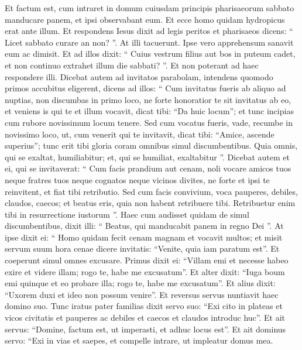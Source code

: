 \begin{biblechapter}
\begin{biblechapter}
\begin{biblechapter}
\begin{biblechapter}
\begin{biblechapter}
\begin{biblechapter}
\begin{biblechapter}
\begin{biblechapter}
\begin{biblechapter}
\begin{biblechapter}
\begin{biblechapter}
\begin{biblechapter}
\begin{biblechapter}
\begin{biblechapter}
\verse Et factum est, cum intraret in domum cuiusdam principis pharisaeorum sabbato manducare panem, et ipsi observabant eum. 
\verse Et ecce homo quidam hydropicus erat ante illum. 
\verse Et respondens Iesus dixit ad legis peritos et pharisaeos dicens: “ Licet sabbato curare an non? ”. 
\verse At illi tacuerunt. Ipse vero apprehensum sanavit eum ac dimisit. 
\verse Et ad illos dixit: “ Cuius vestrum filius aut bos in puteum cadet, et non continuo extrahet illum die sabbati? ”. 
\verse Et non poterant ad haec respondere illi.
 \verse Dicebat autem ad invitatos parabolam, intendens quomodo primos accubitus eligerent, dicens ad illos: 
\verse “ Cum invitatus fueris ab aliquo ad nuptias, non discumbas in primo loco, ne forte honoratior te sit invitatus ab eo, 
\verse et veniens is qui te et illum vocavit, dicat tibi: “Da huic locum”; et tunc incipias cum rubore novissimum locum tenere. 
\verse Sed cum vocatus fueris, vade, recumbe in novissimo loco, ut, cum venerit qui te invitavit, dicat tibi: “Amice, ascende superius”; tunc erit tibi gloria coram omnibus simul discumbentibus. 
\verse Quia omnis, qui se exaltat, humiliabitur; et, qui se humiliat, exaltabitur ”.
 \verse Dicebat autem et ei, qui se invitaverat: “ Cum facis prandium aut cenam, noli vocare amicos tuos neque fratres tuos neque cognatos neque vicinos divites, ne forte et ipsi te reinvitent, et fiat tibi retributio. 
\verse Sed cum facis convivium, voca pauperes, debiles, claudos, caecos; 
\verse et beatus eris, quia non habent retribuere tibi. Retribuetur enim tibi in resurrectione iustorum ”.
 \verse Haec cum audisset quidam de simul discumbentibus, dixit illi: “ Beatus, qui manducabit panem in regno Dei ”. 
\verse At ipse dixit ei: “ Homo quidam fecit cenam magnam et vocavit multos; 
\verse et misit servum suum hora cenae dicere invitatis: “Venite, quia iam paratum est”. 
\verse Et coeperunt simul omnes excusare. Primus dixit ei: “Villam emi et necesse habeo exire et videre illam; rogo te, habe me excusatum”. 
\verse Et alter dixit: “Iuga boum emi quinque et eo probare illa; rogo te, habe me excusatum”. 
\verse Et alius dixit: “Uxorem duxi et ideo non possum venire”. 
\verse Et reversus servus nuntiavit haec domino suo. Tunc iratus pater familias dixit servo suo: “Exi cito in plateas et vicos civitatis et pauperes ac debiles et caecos et claudos introduc huc”. 
\verse Et ait servus: “Domine, factum est, ut imperasti, et adhuc locus est”. 
\verse Et ait dominus servo: “Exi in vias et saepes, et compelle intrare, ut impleatur domus mea. 

\end{biblechapter}
\end{biblechapter}
\end{biblechapter}
\end{biblechapter}
\end{biblechapter}
\end{biblechapter}
\end{biblechapter}
\end{biblechapter}
\end{biblechapter}
\end{biblechapter}
\end{biblechapter}
\end{biblechapter}
\end{biblechapter}
\end{biblechapter}
